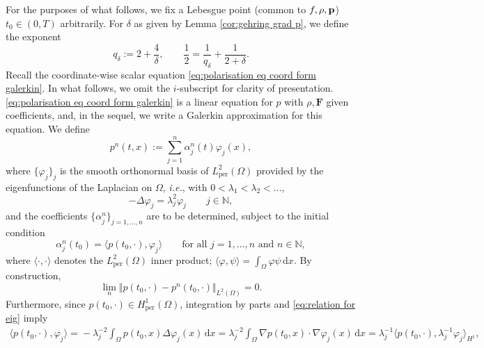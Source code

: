 \documentclass[11pt,a4paper,reqno]{amsart}
\theoremstyle{remark}
\theoremstyle{definition}
\numberwithin{equation}{section}
\newcommand{\per}{\mathrm{per}}
\newcommand{\p}{{\bf p}}
\renewcommand{\d}{\, \mathrm{d} }
\begin{document}
For the purposes of what follows, we fix a Lebesgue point (common to $f,\rho,\p$) $t_0 \in (0,T)$ arbitrarily. For $\delta$ as given by Lemma \ref{cor:gehring grad p}, we define the exponent 
\begin{equation}\label{eq:qdelta def}
q_\delta := 2 + \frac{4}{\delta}, \qquad \frac{1}{2} = \frac{1}{q_\delta} + \frac{1}{2+\delta}. 
\end{equation}
Recall the coordinate-wise scalar equation \eqref{eq:polarisation eq coord form galerkin}. In what follows, we omit the $i$-subscript for clarity of presentation. \eqref{eq:polarisation eq coord form galerkin} is a linear equation for $p$ with $\rho,\mathbf{F}$ given coefficients, and, in the sequel, we write a Galerkin approximation for this equation. We define 
\begin{equation}\label{eq:ansatz p n}
    p^n(t,x) := \sum_{j=1}^n \alpha^n_{j}(t) \varphi_{j}(x), 
\end{equation}
where $\{\varphi_{j}\}_{j}$ is the smooth orthonormal basis of $L^2_\per(\Omega)$ provided by the eigenfunctions of the Laplacian on $\Omega$, \textit{i.e.}, with $0 < \lambda_1 < \lambda_2 < \dots$, 
\begin{equation}\label{eq:relation for eig}
    -\Delta \varphi_j = \lambda_j^2 \varphi_j \qquad j \in \mathbb{N}, 
\end{equation}
and the coefficients $\{\alpha^n_{j}\}_{j=1,\dots,n}$ are to be determined, subject to the initial condition 
\begin{equation}\label{eq:initial data galerkin}
    \alpha^n_{j}(t_0) = \langle p(t_0,\cdot), \varphi_{j} \rangle \qquad \text{for all } j=1,\dots,n \text{ and } n\in\mathbb{N}, 
\end{equation}
where $\langle \cdot , \cdot \rangle$ denotes the $L^2_\per(\Omega)$ inner product; $\langle \varphi , \psi \rangle = \int_\Omega \varphi \psi \d x$. By construction, 
\begin{equation}\label{eq:conv of initial data for galerkin ii}
    \lim_n \Vert p(t_0,\cdot) - p^n(t_0,\cdot) \Vert_{L^2(\Omega)} = 0. 
\end{equation}
Furthermore, since $p(t_0,\cdot) \in H^1_\per(\Omega)$, integration by parts and \eqref{eq:relation for eig} imply 
\begin{equation*}
   \begin{aligned}
       \langle p(t_0,\cdot) ,\! \varphi_j \rangle \! =\!\! -\lambda_j^{-2}\!\!\int_\Omega\!\! p(t_0,x) \Delta \varphi_j(x) \! \d x \!=\! \lambda_j^{-2}\!\!\int_\Omega\!\! \nabla p(t_0,x) \! \cdot \! \nabla \varphi_j(x) \! \d x \!=\! \lambda_j^{-1}\!\langle p (t_0,\cdot) ,\! \lambda_j^{-1}\!\varphi_j \rangle_{H^1}, 
   \end{aligned} 
\end{equation*}
\end{document}
